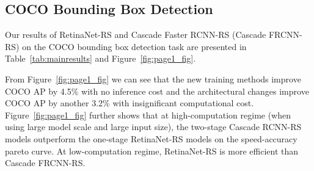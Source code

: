 \documentclass[final]{cvpr}
\begin{document}
\subsection{COCO Bounding Box Detection}\label{sec:exp_coco_box}
Our results of RetinaNet-RS and Cascade Faster RCNN-RS (Cascade FRCNN-RS) on the COCO bounding box detection task are presented in Table~\ref{tab:mainresults} and Figure~\ref{fig:page1_fig}.

From Figure~\ref{fig:page1_fig} we can see that the new training methods improve COCO AP by 4.5\% with no inference cost and the architectural changes improve COCO AP by another 3.2\% with insignificant computational cost. Figure~\ref{fig:page1_fig} further shows that at high-computation regime (\eg when using large model scale and large input size), the two-stage Cascade RCNN-RS models outperform the one-stage RetinaNet-RS models on the speed-accuracy pareto curve. At low-computation regime, RetinaNet-RS is more efficient than Cascade FRCNN-RS.
\end{document}
